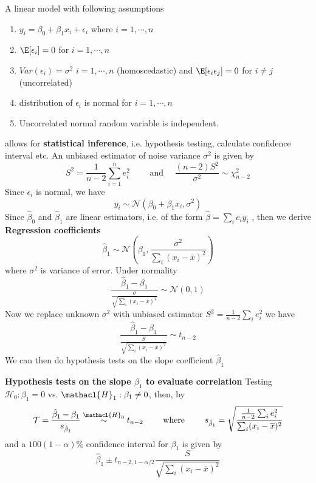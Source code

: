 \documentclass[11pt]{article}
\begin{document}
\begin{defn*}
  A linear model with following assumptions
  \begin{enumerate}
    \item $y_i = \beta_0 + \beta_1 x_i + \epsilon_i$ where $i = 1, \cdots, n$
    \item $\E[\epsilon_i] = 0$ for $i = 1,\cdots,n$
    \item $Var(\epsilon_i) = \sigma^2$ $i = 1,\cdots, n$ (homoscedastic) and $\E[\epsilon_i \epsilon_j] = 0$ for $i\neq j$ (uncorrelated)
    \item distribution of $\epsilon_i$  is normal for $i = 1,\cdots,n$
    \item Uncorrelated normal random variable is independent.
  \end{enumerate}
  allows for \textbf{statistical inference}, i.e. hypothesis testing, calculate confidence interval etc. An unbiased estimator of noise variance $\sigma^2$ is given by
  \[
    S^2 = \frac{1}{n - 2} \sum_{i=1}^n e_i^2 \quad \quad \text{ and } \quad \frac{(n-2)S^2}{\sigma^2} \sim \chi_{n-2}^2
  \]
  Since $\epsilon_i$ is normal, we have
  \[
    y_i \sim \mathcal{N}(\beta_0 + \beta_1 x_i, \sigma^2)
  \]
  Since $\hat{\beta}_0$ and $\hat{\beta}_1$ are linear estimators, i.e. of the form $\hat{\beta} = \sum_i c_i y_i$ , then we derive \textbf{Regression coefficients}
  \[
    \hat{\beta}_1 \sim \mathcal{N}(\beta_1, \frac{\sigma^2}{\sum_i (x_i - \overline{x})^2})
  \]
  where $\sigma^2$ is variance of error. Under normality
  \[
    \frac{ \hat{\beta}_1 - \beta_1 }{ \frac{\sigma}{\sqrt{ \sum_i (x_i - \overline{x})^2 }}} \sim \mathcal{N}(0,1)
  \]
  Now we replace unknown $\sigma^2$ with unbiased estimator $S^2 = \frac{1}{n-2}\sum_i e_i^2$ we have
  \[
    \frac{ \hat{\beta}_1 - \beta_1 }{ \frac{S}{\sqrt{ \sum_i (x_i - \overline{x})^2 }}} \sim t_{n-2}
  \]
  We can then do hypothesis tests on the slope coefficient $\hat{\beta}_1$
\end{defn*}

\begin{defn*}
  \textbf{Hypothesis tests on the slope $\beta_1$ to evaluate correlation} Testing $\mathcal{H}_0: \beta_1 = 0$ vs. $\mathacl{H}_1: \beta_1 \neq 0$, then, by
  \[
    \mathcal{T} =
    \frac{\hat{\beta}_1 - \beta_1}{s_{\hat{\beta}_1}} \stackrel{\mathacl{H}_0}{\sim} t_{n-2} \quad\quad \text{ where }\quad\quad s_{\hat{\beta}_1} = \sqrt{\frac{\frac{1}{n-2} \sum_i e_i^2}{\sum_i (x_i - \overline{x})^2}}
  \]
  and a $100(1-\alpha)\%$ confidence interval for $\beta_1$ is given by
  \[
    \hat{\beta}_1 \pm t_{n-2, 1 - \alpha/2} \frac{S}{\sqrt{\sum_i (x_i - \overline{x})^2 }}
  \]
\end{defn*}
\end{document}
